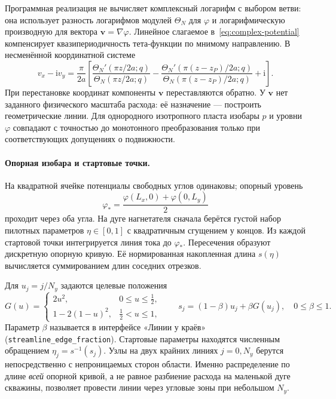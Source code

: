 \documentclass[12pt,a4paper]{article}
\begin{document}
Программная реализация не вычисляет комплексный логарифм с выбором ветви:
она использует разность логарифмов модулей $\Theta_N$ для $\varphi$ и
логарифмическую производную для вектора $\mathbf v=\nabla\varphi$.
Линейное слагаемое в~\eqref{eq:complex-potential} компенсирует
квазипериодичность тета-функции по мнимому направлению. В несменённой
координатной системе
\begin{equation}
 v_x-\mathrm i v_y=\frac{\pi}{2a}
 \left[
 \frac{\Theta_N'(\pi z/2a;q)}{\Theta_N(\pi z/2a;q)}
 -\frac{\Theta_N'(\pi(z-z_P)/2a;q)}
 {\Theta_N(\pi(z-z_P)/2a;q)}+\mathrm i
 \right].
 \label{eq:complex-velocity}
\end{equation}
При перестановке координат компоненты $\mathbf v$ переставляются обратно.
У $\mathbf v$ нет заданного физического масштаба расхода: её назначение
--- построить геометрические линии. Для однородного изотропного пласта
изобары $p$ и уровни $\varphi$ совпадают с точностью до монотонного
преобразования только при соответствующих допущениях о подвижности.

\paragraph{Опорная изобара и стартовые точки.}
На квадратной ячейке потенциалы свободных углов одинаковы; опорный уровень
\begin{equation}
 \varphi_*=\frac{\varphi(L_x,0)+\varphi(0,L_y)}{2}
 \label{eq:reference-level}
\end{equation}
проходит через оба угла. На дуге нагнетателя сначала берётся густой набор
пилотных параметров $\eta\in[0,1]$ с квадратичным сгущением у концов.
Из каждой стартовой точки интегрируется линия тока до $\varphi_*$.
Пересечения образуют дискретную опорную кривую. Её нормированная накопленная
длина $s(\eta)$ вычисляется суммированием длин соседних отрезков.

Для $u_j=j/N_y$ задаются целевые положения
\begin{equation}
 G(u)=\begin{cases}
 2u^2,&0\le u\le\tfrac12,\\
 1-2(1-u)^2,&\tfrac12<u\le1,
 \end{cases}\qquad
 s_j=(1-\beta)u_j+\beta G(u_j),\quad 0\le\beta\le1.
 \label{eq:streamline-grading}
\end{equation}
Параметр $\beta$ называется в интерфейсе «Линии у краёв»
(\texttt{streamline\_edge\_fraction}). Стартовые параметры находятся
численным обращением $\eta_j=s^{-1}(s_j)$. Узлы на двух крайних линиях
$j=0,N_y$ берутся непосредственно с непроницаемых сторон области.
Именно распределение по длине \emph{всей} опорной кривой, а не равное
разбиение расхода на маленькой дуге скважины, позволяет провести линии через
угловые зоны при небольшом $N_y$.
\end{document}
